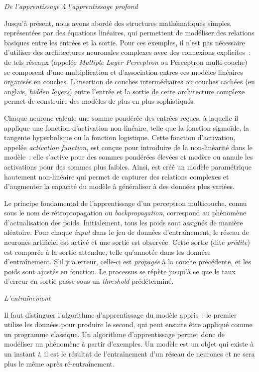 \emph{De l'apprentissage à l'apprentissage profond}

Jusqu'à présent, nous avons abordé des structures mathématiques simples,
représentées par des équations linéaires, qui permettent de modéliser
des relations basiques entre les entrées et la sortie. Pour ces
exemples, il n'est pas nécessaire d'utiliser des architectures
neuronales complexes avec des connexions explicites~: de tels réseaux
(appelée \emph{Multiple Layer Perceptron} ou Perceptron multi-couche) se
composent d'une multiplication et d'association entres ces modèles
linéaires organisés en couches. L'insertion de couches intermédiaires ou
couches cachées (en anglais, \textit{hidden layers}) entre l'entrée et la sortie
de cette architecture complexe permet de construire des modèles de plus
en plus sophistiqués.

Chaque neurone calcule une somme pondérée des entrées reçues, à laquelle
il applique une fonction d'activation non linéaire, telle que la
fonction sigmoïde, la tangente hyperbolique ou la fonction logistique.
Cette fonction d'activation, appelée \textit{activation function}, est conçue
pour introduire de la non-linéarité dans le modèle~: elle s'active pour
des sommes pondérées élevées et modère ou annule les activations pour
des sommes plus faibles. Ainsi, est créé un modèle paramétrique
hautement non-linéaire qui permet de capturer des relations complexes et
d'augmenter la capacité du modèle à généraliser à des données plus
variées.

Le principe fondamental de l'apprentissage d'un perceptron multicouche,
connu sous le nom de rétropropagation ou \emph{backpropagation},
correspond au phénomène d'actualisation des poids. Initialement, tous
les poids sont assignés de manière aléatoire. Pour chaque \textit{input} dans le
jeu de données d'entraînement, le réseau de neurones artificiel est
activé et une sortie est observée. Cette sortie (dite \emph{prédite})
est comparée à la sortie attendue, telle qu'annotée dans les données
d'entraînement. S'il y a erreur, celle-ci est \textit{propagée} à la couche
précédente, et les poids sont ajustés en fonction. Le processus se
répète jusqu'à ce que le taux d'erreur en sortie passe sous un
\emph{threshold} prédéterminé.

\emph{L'entraînement}

Il faut distinguer l'algorithme d'apprentissage du modèle appris~: le
premier utilise les données pour produire le second, qui peut ensuite
être appliqué comme un programme classique. Un algorithme
d'apprentissage permet donc de modéliser un phénomène à partir
d'exemples. Un modèle est un objet qui existe à un instant \emph{t}, il
est le résultat de l'entraînement d'un réseau de neurones et ne sera
plus le même après ré-entraînement.

